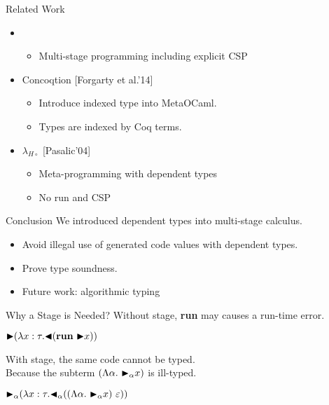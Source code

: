 \documentclass[dvipdfmx,aspectratio=169, 20pt]{beamer}
\begin{document}
\begin{frame}[fragile]{Related Work}
    \begin{itemize}
        \item {}
            \begin{itemize}
                \item Multi-stage programming including explicit CSP
            \end{itemize}
        \item Concoqtion [Forgarty et al.'14]
            \begin{itemize}
                \item Introduce indexed type into MetaOCaml.
                \item Types are indexed by Coq terms.
            \end{itemize}
        \item \( \lambda_{H\circ} \) [Pasalic'04]
            \begin{itemize}
                \item Meta-programming with dependent types
                \item No run and CSP
            \end{itemize}
    \end{itemize}
    \note{
    }
\end{frame}

\begin{frame}[fragile]{Conclusion}
    We introduced dependent types into multi-stage calculus.
    \begin{itemize}
        \item Avoid illegal use of generated code values with dependent types.
        \item Prove type soundness.
        \item Future work: algorithmic typing
    \end{itemize}
    \note{
    }
\end{frame}

\begin{frame}[fragile]{Why a Stage is Needed?}
    Without stage, \textbf{run} may causes a run-time error.
    \begin{exampleblock}{}
        \begin{center}
    \( \TB (\lambda x:\tau. \TBL (\textbf{run}\ \TB x)) \)
        \end{center}
    \end{exampleblock}

    With stage, the same code cannot be typed.\\
    Because the subterm \( (\Lambda\alpha.\ \TB_\alpha x) \) is ill-typed.
    \begin{exampleblock}{}
        \begin{center}
    \( {\mathop{\blacktriangleright}}_\alpha (\lambda x:\tau. {\mathop{\blacktriangleleft}}_\alpha ((\Lambda\alpha.\ {\mathop{\blacktriangleright}}_\alpha x)\ \varepsilon)) \)
        \end{center}
    \end{exampleblock}
\end{frame}
\end{document}
